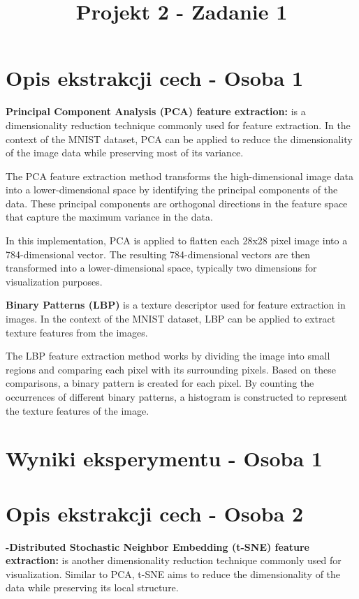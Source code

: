 \documentclass[12pt]{article}
\title{Projekt 2 - Zadanie 1}
\begin{document}
\maketitle
    \section{Opis ekstrakcji cech - Osoba 1}
    \textbf{Principal Component Analysis (PCA) feature extraction:}
    is a dimensionality reduction technique commonly used for feature extraction. In the context of the MNIST dataset, PCA can be applied to reduce the dimensionality of the image data while preserving most of its variance.

    The PCA feature extraction method transforms the high-dimensional image data into a lower-dimensional space by identifying the principal components of the data. These principal components are orthogonal directions in the feature space that capture the maximum variance in the data.

    In this implementation, PCA is applied to flatten each 28x28 pixel image into a 784-dimensional vector. The resulting 784-dimensional vectors are then transformed into a lower-dimensional space, typically two dimensions for visualization purposes.



    \textbf{Binary Patterns (LBP)} is a texture descriptor used for feature extraction in images. In the context of the MNIST dataset, LBP can be applied to extract texture features from the images.

    The LBP feature extraction method works by dividing the image into small regions and comparing each pixel with its surrounding pixels. Based on these comparisons, a binary pattern is created for each pixel. By counting the occurrences of different binary patterns, a histogram is constructed to represent the texture features of the image.

    \pagebreak

    \section{Wyniki eksperymentu - Osoba 1}
    \pagebreak

    \section{Opis ekstrakcji cech - Osoba 2}
    \textbf{-Distributed Stochastic Neighbor Embedding (t-SNE) feature extraction:}
    is another dimensionality reduction technique commonly used for visualization. Similar to PCA, t-SNE aims to reduce the dimensionality of the data while preserving its local structure.
\end{document}
